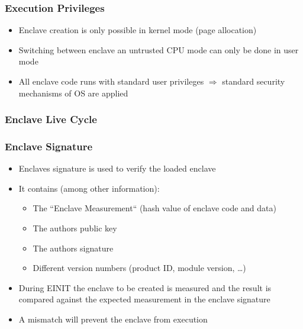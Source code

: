 \begin{frame}
    \frametitle{Execution Privileges}
    \begin{itemize}[<+->]
        \item Enclave creation is only possible in kernel mode (page allocation)
        \item Switching between enclave an untrusted CPU mode can only be done in user mode
        \item All enclave code runs with standard user privileges \newline
              $\Rightarrow$ standard security mechanisms of OS are applied    
    \end{itemize}
\end{frame}

\begin{frame}
    \frametitle{Enclave Live Cycle}
    \centering
\end{frame}

\begin{frame}
    \frametitle{Enclave Signature}
    \label{fr:EncSig}
    \begin{itemize}[<+->]
        \item Enclaves signature is used to verify the loaded enclave
        \item It contains (among other information):
        \begin{itemize}
            \item The ``Enclave Measurement`` (hash value of enclave code and data)
            \item The authors public key
            \item The authors signature
            \item Different version numbers (product ID, module version, \dots)
        \end{itemize}
        \item During EINIT the enclave to be created is measured and the result is compared against the expected measurement in the enclave signature
        \item A mismatch will prevent the enclave from execution
    \end{itemize}
\end{frame}


